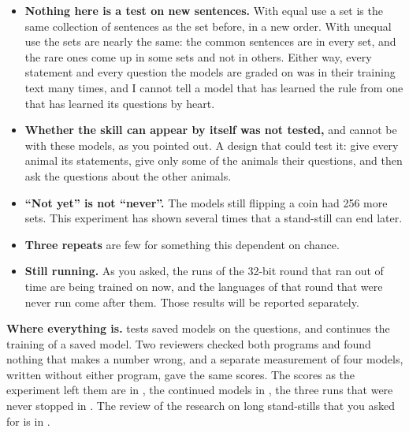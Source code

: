 \begin{itemize}
\item \textbf{Nothing here is a test on new sentences.} With equal use a set is the same
      collection of sentences as the set before, in a new order. With unequal use the sets
      are nearly the same: the common sentences are in every set, and the rare ones come up
      in some sets and not in others. Either way, every statement and every question the
      models are graded on was in their training text many times, and I cannot tell a model
      that has learned the rule from one that has learned its questions by heart.
\item \textbf{Whether the skill can appear by itself was not tested,} and cannot be with
      these models, as you pointed out. A design that could test it: give every animal its
      statements, give only some of the animals their questions, and then ask the questions
      about the other animals.
\item \textbf{``Not yet'' is not ``never''.} The models still flipping a coin had 256 more
      sets. This experiment has shown several times that a stand-still can end later.
\item \textbf{Three repeats} are few for something this dependent on chance.
\item \textbf{Still running.} As you asked, the runs of the 32-bit round that ran out of time
      are being trained on now, and the languages of that round that were never run come
      after them. Those results will be reported separately.
\end{itemize}

\textbf{Where everything is.}  tests saved models on the questions, and
 continues the training of a saved model. Two reviewers checked both
programs and found nothing that makes a number wrong, and a separate measurement of four
models, written without either program, gave the same scores. The scores as the experiment
left them are in , the continued models in , the
three runs that were never stopped in . The review of the research on
long stand-stills that you asked for is in .
